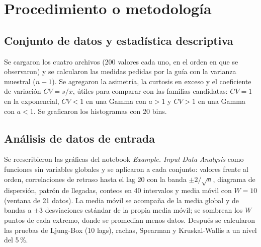 \documentclass[11pt,a4paper]{article}
\begin{document}
\section{Procedimiento o metodología}
\subsection{Conjunto de datos y estadística descriptiva}
Se cargaron los cuatro archivos (200 valores cada uno, en el orden en que se observaron) y se
calcularon las medidas pedidas por la guía con la varianza muestral ($n-1$). Se agregaron la
asimetría, la curtosis en exceso y el coeficiente de variación $CV=s/\bar x$, útiles para
comparar con las familias candidatas: $CV=1$ en la exponencial, $CV<1$ en una Gamma con $a>1$ y
$CV>1$ en una Gamma con $a<1$. Se graficaron los histogramas con 20 bins.

\subsection{Análisis de datos de entrada}
Se reescribieron las gráficas del notebook \emph{Example. Input Data Analysis} como funciones sin
variables globales y se aplicaron a cada conjunto: valores frente al orden, correlaciones de
retraso hasta el lag 20 con la banda $\pm2/\sqrt n$, diagrama de dispersión, patrón de llegadas,
conteos en 40 intervalos y media móvil con $W=10$ (ventana de 21 datos). La media móvil se
acompaña de la media global y de bandas a $\pm3$ desviaciones estándar de la propia media
móvil; se sombrean los $W$ puntos de cada extremo, donde se promedian menos datos. Después se
calcularon las pruebas de Ljung-Box (10 lags), rachas, Spearman y Kruskal-Wallis a un nivel del
5\,\%.
\end{document}
